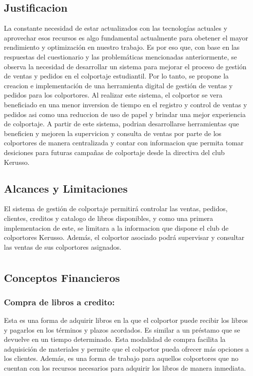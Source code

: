 \documentclass[runningheads]{llncs}
\begin{document}
\subsection{Justificacion}

La constante necesidad de estar actualizados con las tecnologías actuales y aprovechar esos recursos es algo fundamental actualmente para obetener el mayor rendimiento y optimización en nuestro trabajo. Es por eso que, con base en las respuestas del cuestionario y las problemáticas mencionadas anteriormente, se observa la necesidad de desarrollar un sistema para mejorar el proceso de gestión de ventas y pedidos en el colportaje estudiantil. Por lo tanto, se propone la creacion e implementación de una herramienta digital de gestión de ventas y pedidos para los colportores. Al realizar este sistema, el colportor se vera beneficiado en una menor inversion de tiempo en el registro y control de ventas y pedidos asi como una reduccion de uso de papel y brindar una mejor experiencia de colportaje. A partir de este sistema, podrian desarrollarse herramientas que beneficien y mejoren la supervicion y consulta de ventas por parte de los colportores de manera centralizada y contar con informacion que permita tomar desiciones para futuras campañas de colportaje desde la directiva del club Kerusso.


\subsection{Alcances y Limitaciones}
El sistema de gestión de colportaje permitirá controlar las ventas, pedidos, clientes, creditos y catalogo de libros disponibles, y como una primera implementacion de este, se limitara a la informacion que dispone el club de colportores Kerusso. Además, el colportor asociado podrá supervisar y consultar las ventas de sus colportores asignados.

\newpage

\section{}

\subsection{Conceptos Financieros}
\subsubsection{Compra de libros a credito: }Esta es una forma de adquirir libros en la que el colportor puede recibir los libros y pagarlos en los términos y plazos acordados. Es similar a un préstamo que se devuelve en un tiempo determinado. Esta modalidad de compra facilita la adquisición de materiales y permite que el colportor pueda ofrecer más opciones a los clientes. Además, es una forma de trabajo para aquellos colportores que no cuentan con los recursos necesarios para adquirir los libros de manera inmediata.
\end{document}
